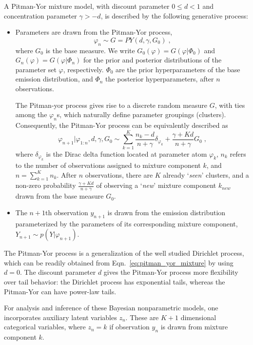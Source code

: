 A Pitman-Yor mixture model, with discount parameter $0 \leq d < 1$ and concentration parameter $\gamma > -d$, is described by the following generative process:
\begin{itemize}
	\item Parameters are drawn from the Pitman-Yor process, \ie
		\begin{equation}
		\varphi_n \sim G=PY(d, \gamma, G_0) \; ,
		\end{equation}
		where $G_0$ is the base measure.
		We write $G_0(\varphi)=G(\varphi|\varPhi_0)$ and $G_n(\varphi)=G(\varphi|\varPhi_n)$ for the prior and posterior distributions of the parameter set $\varphi$, respectively.  $\varPhi_0$ are the prior hyperparameters of the base emission distribution, and $\varPhi_n$ the posterior hyperparameters, after $n$ observations.
		
		The Pitman-yor process gives rise to a discrete random measure $G$, with ties among the $\varphi_n$s, which naturally define parameter groupings (clusters). Consequently, the Pitman-Yor process can be equivalently described as	
		\begin{equation}
		\varphi_{n+1}|\varphi_{1:n}, d, \gamma, G_0 \sim \sum_{k=1}^{K} \frac{n_k-d}{n+\gamma}\delta_{\varphi_k} + \frac{\gamma+Kd}{n+\gamma}G_0 \;,
		\label{eq:pitman_yor_mixture}
		\end{equation}
		where $\delta_{\varphi_k}$ is the Dirac delta function located at parameter atom $\varphi_k$, $n_k$ refers to the number of observations assigned to mixture component $k$, and $n=\sum_{k=1}^Kn_k$. After $n$ observations, there are $K$ already `\textit{seen}' clusters, and a non-zero probability $\frac{\gamma+Kd}{n+\gamma}$ of observing a `\textit{new}' mixture component $k_{new}$ drawn from the base measure $G_0$.
	
	\item The $n+1$th observation $y_{n+1}$ is drawn from the emission distribution parameterized by the parameters of its corresponding mixture component, \ie $Y_{n+1} \sim p(Y|\varphi_{n+1})$.
\end{itemize}

The Pitman-Yor process is a generalization of the well studied Dirichlet process, which can be readily obtained from Eqn.~\eqref{eq:pitman_yor_mixture} by using $d=0$. The discount parameter $d$ gives the Pitman-Yor process more flexibility over tail behavior: the Dirichlet process has exponential tails, whereas the Pitman-Yor can have power-law tails.

For analysis and inference of these Bayesian nonparametric models, one incorporates auxiliary latent variables $z_n$. These are $K+1$ dimensional categorical variables, where $z_{n}=k$ if observation $y_n$ is drawn from mixture component $k$.

